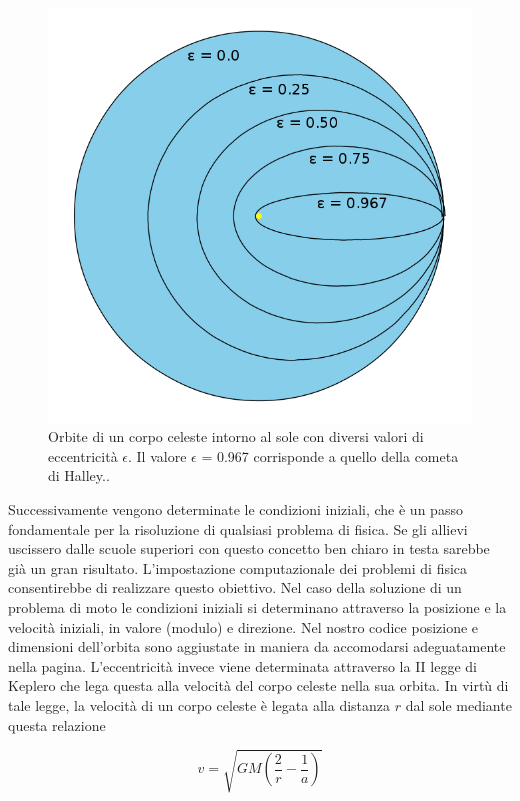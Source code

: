 \begin{figure}[h]
   \centering
   \includegraphics[width=12.0cm]{./images/cerchio/orbite.png}
   \caption{Orbite di un corpo celeste intorno al sole con diversi valori di
	eccentricità $\epsilon$. Il valore $\epsilon$ = 0.967 corrisponde a quello della cometa di Halley..}
   \label{orbite-halley}
\end{figure}

Successivamente vengono determinate le condizioni iniziali, che è un passo fondamentale per la risoluzione di qualsiasi problema di fisica. Se gli allievi uscissero dalle scuole superiori con questo concetto ben  chiaro in testa sarebbe già un gran risultato. L'impostazione computazionale dei problemi di fisica consentirebbe di realizzare questo obiettivo. Nel caso della soluzione di un problema di moto le condizioni iniziali si determinano attraverso la posizione e la velocità iniziali, in valore (modulo) e direzione. Nel nostro codice posizione e dimensioni dell'orbita sono aggiustate in maniera da accomodarsi adeguatamente nella pagina. L'eccentricità invece viene determinata attraverso la II legge di Keplero che lega questa alla velocità del corpo celeste nella sua orbita. In virtù di tale legge, la velocità  di un corpo celeste è legata alla distanza $r$ dal sole mediante questa relazione

\begin{equation} \label{eq:keplero-II}
v = \sqrt{GM(\frac{2}{r}-\frac{1}{a})}
\end{equation}

